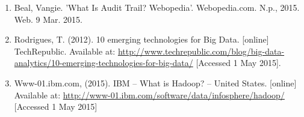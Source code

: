 \begin{enumerate}
\item Beal, Vangie. 'What Is Audit Trail? Webopedia'. Webopedia.com. N.p., 2015. Web. 9 Mar. 2015.\\ 

\item Rodrigues, T. (2012). 10 emerging technologies for Big  Data. [online] TechRepublic. Available at:  \url{http://www.techrepublic.com/blog/big-data-analytics/10-emerging-technologies-for-big-data/} [Accessed 1 May 2015]. \\

\item Www-01.ibm.com, (2015). IBM – What is Hadoop? – United States. [online] Available at: \url{http://www-01.ibm.com/software/data/infosphere/hadoop/} [Accessed 1 May 2015] \\
\end{enumerate}


